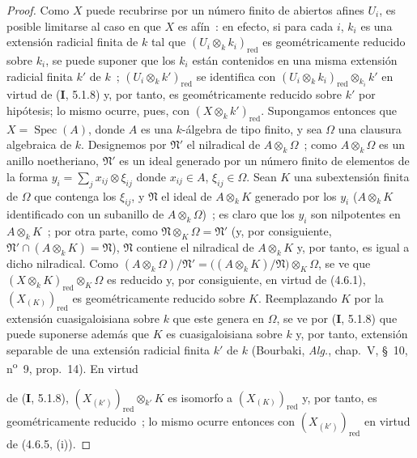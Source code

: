 \begin{proof}
Como $X$ puede recubrirse por un número finito de abiertos afines $U_i$, es posible
limitarse al caso en que $X$ es afín~: en efecto, si para cada $i$, $k_i$ es
una extensión radicial finita de $k$ tal que
$(U_i\otimes_k k_i)_{\mathrm{red}}$ es geométricamente reducido sobre $k_i$,
se puede suponer que los $k_i$ están contenidos en una misma extensión radicial
finita $k'$ de $k$~; $(U_i\otimes_k k')_{\mathrm{red}}$ se identifica con
$(U_i\otimes_k k_i)_{\mathrm{red}}\otimes_{k_i}k'$
en virtud de (\textbf I, 5.1.8) y, por tanto, es geométricamente reducido sobre $k'$ por
hipótesis; lo mismo ocurre, pues, con $(X\otimes_k k')_{\mathrm{red}}$.
Supongamos entonces que $X=\operatorname{Spec}(A)$, donde $A$ es una $k$-álgebra
de tipo finito, y sea $\Omega$ una clausura algebraica de $k$. Designemos por
$\mathfrak N'$ el nilradical de $A\otimes_k\Omega$~; como $A\otimes_k\Omega$ es
un anillo noetheriano, $\mathfrak N'$ es un ideal generado por un número finito
de elementos de la forma
$y_i=\sum_j x_{ij}\otimes\xi_{ij}$ donde $x_{ij}\in A$, $\xi_{ij}\in\Omega$.
Sean $K$ una subextensión finita de $\Omega$ que contenga los $\xi_{ij}$, y
$\mathfrak N$ el ideal de $A\otimes_k K$ generado por los $y_i$
($A\otimes_k K$ identificado con un subanillo de $A\otimes_k\Omega$)~; es claro
que los $y_i$ son nilpotentes en $A\otimes_k K$~; por otra parte, como
$\mathfrak N\otimes_K\Omega=\mathfrak N'$ (y, por consiguiente,
$\mathfrak N'\cap(A\otimes_k K)=\mathfrak N$), $\mathfrak N$ contiene el
nilradical de $A\otimes_k K$ y, por tanto, es igual a dicho nilradical. Como
$(A\otimes_k\Omega)/\mathfrak N'
=\bigl((A\otimes_k K)/\mathfrak N\bigr)\otimes_K\Omega$,
se ve que $(X\otimes_k K)_{\mathrm{red}}\otimes_K\Omega$ es reducido y, por
consiguiente, en virtud de (4.6.1), $(X_{(K)})_{\mathrm{red}}$ es
geométricamente reducido sobre $K$. Reemplazando $K$ por la extensión
cuasigaloisiana sobre $k$ que este genera en $\Omega$, se ve por (\textbf I, 5.1.8) que
puede suponerse además que $K$ es
cuasigaloisiana sobre $k$ y, por tanto, extensión separable de una extensión
radicial finita $k'$ de $k$ (Bourbaki, \emph{Alg.}, chap.~V, \S~10,
n\textsuperscript{o}~9, prop.~14). En virtud


de (\textbf I, 5.1.8), $(X_{(k')})_{\mathrm{red}}\otimes_{k'}K$ es isomorfo a
$(X_{(K)})_{\mathrm{red}}$ y, por tanto, es geométricamente reducido~; lo mismo
ocurre entonces con $(X_{(k')})_{\mathrm{red}}$ en virtud de (4.6.5, (i)).
\end{proof}

